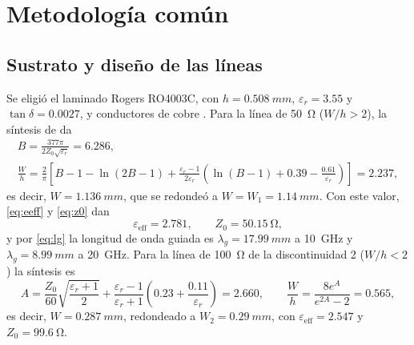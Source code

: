 \documentclass[11pt,letterpaper]{article}
\begin{document}
\section{Metodología común}

\subsection{Sustrato y diseño de las líneas}
\label{sec:diseno}
Se eligió el laminado Rogers RO4003C, con $h=\SI{0.508}{mm}$, $\varepsilon_r=3.55$ y $\tan\delta=0.0027$, y conductores de cobre \cite{rogers}. Para la línea de \SI{50}{\ohm} ($W/h>2$), la síntesis de \cite{pozar} da
\begin{gather}
B = \frac{377\pi}{2Z_0\sqrt{\varepsilon_r}} = 6.286, \nonumber\\[4pt]
\frac{W}{h} = \frac{2}{\pi}\left[B-1-\ln(2B-1)+\frac{\varepsilon_r-1}{2\varepsilon_r}\left(\ln(B-1)+0.39-\frac{0.61}{\varepsilon_r}\right)\right] = 2.237,
\label{eq:sintesis}
\end{gather}
es decir, $W=\SI{1.136}{mm}$, que se redondeó a $W=W_1=\SI{1.14}{mm}$. Con este valor, \eqref{eq:eeff} y \eqref{eq:z0} dan
\[
\varepsilon_{\mathrm{eff}} = 2.781, \qquad Z_0 = \SI{50.15}{\ohm},
\]
y por \eqref{eq:lg} la longitud de onda guiada es $\lambda_g=\SI{17.99}{mm}$ a \SI{10}{GHz} y $\lambda_g=\SI{8.99}{mm}$ a \SI{20}{GHz}. Para la línea de \SI{100}{\ohm} de la discontinuidad 2 ($W/h<2$) la síntesis es
\begin{equation}
A = \frac{Z_0}{60}\sqrt{\frac{\varepsilon_r+1}{2}} + \frac{\varepsilon_r-1}{\varepsilon_r+1}\left(0.23+\frac{0.11}{\varepsilon_r}\right) = 2.660, \qquad
\frac{W}{h} = \frac{8e^A}{e^{2A}-2} = 0.565,
\label{eq:sintesis100}
\end{equation}
es decir, $W=\SI{0.287}{mm}$, redondeado a $W_2=\SI{0.29}{mm}$, con $\varepsilon_{\mathrm{eff}}=2.547$ y $Z_0=\SI{99.6}{\ohm}$.
\end{document}
